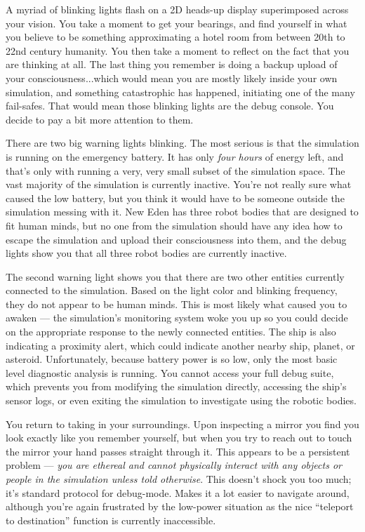 \documentclass[char]{guildcamp1}
\begin{document}
A myriad of blinking lights flash on a 2D heads-up display superimposed across your vision. You take a moment to get your bearings, and find yourself in what you believe to be something approximating a hotel room from between 20th to 22nd century humanity. You then take a moment to reflect on the fact that you are thinking at all. The last thing you remember is doing a backup upload of your consciousness...which would mean you are mostly likely inside your own simulation, and something catastrophic has happened, initiating one of the many fail-safes. That would mean those blinking lights are the debug console. You decide to pay a bit more attention to them.

There are two big warning lights blinking. The most serious is that the simulation is running on the emergency battery. It has only \emph{four hours} of energy left, and that's only with running a very, very small subset of the simulation space. The vast majority of the simulation is currently inactive. You're not really sure what caused the low battery, but you think it would have to be someone outside the simulation messing with it. New Eden has three robot bodies that are designed to fit human minds, but no one from the simulation should have any idea how to escape the simulation and upload their consciousness into them, and the debug lights show you that all three robot bodies are currently inactive.

The second warning light shows you that there are two other entities currently connected to the simulation. Based on the light color and blinking frequency, they do not appear to be human minds. This is most likely what caused you to awaken --- the simulation's monitoring system woke you up so you could decide on the appropriate response to the newly connected entities. The ship is also indicating a proximity alert, which could indicate another nearby ship, planet, or asteroid. Unfortunately, because battery power is so low, only the most basic level diagnostic analysis is running. You cannot access your full debug suite, which prevents you from modifying the simulation directly, accessing the ship's sensor logs, or even exiting the simulation to investigate using the robotic bodies.

You return to taking in your surroundings. Upon inspecting a mirror you find you look exactly like you remember yourself, but when you try to reach out to touch the mirror your hand passes straight through it. This appears to be a persistent problem --- \emph{you are ethereal and cannot physically interact with any objects or people in the simulation unless told otherwise}. This doesn't shock you too much; it's standard protocol for debug-mode. Makes it a lot easier to navigate around, although you're again frustrated by the low-power situation as the nice ``teleport to destination'' function is currently inaccessible.
\end{document}
